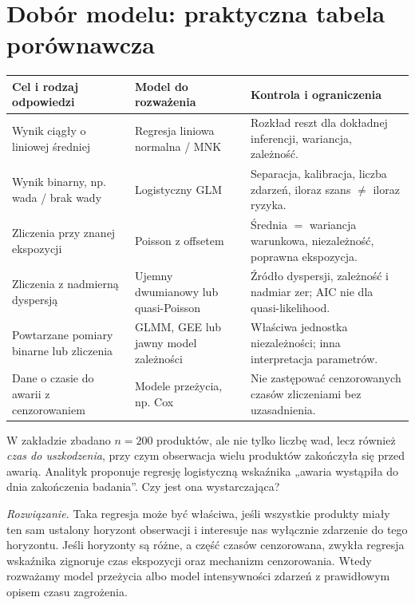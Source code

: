 \section{Dobór modelu: praktyczna tabela porównawcza}
\begin{center}\small
\begin{tabular}{>{\raggedright\arraybackslash}p{}>{\raggedright\arraybackslash}p{}>{\raggedright\arraybackslash}p{}}
\toprule
\textbf{Cel i rodzaj odpowiedzi} & \textbf{Model do rozważenia} & \textbf{Kontrola i ograniczenia}\\
\midrule
Wynik ciągły o liniowej średniej & Regresja liniowa normalna / MNK & Rozkład reszt dla dokładnej inferencji, wariancja, zależność.\\
Wynik binarny, np. wada / brak wady & Logistyczny GLM & Separacja, kalibracja, liczba zdarzeń, iloraz szans $\ne$ iloraz ryzyka.\\
Zliczenia przy znanej ekspozycji & Poisson z offsetem & Średnia $=$ wariancja warunkowa, niezależność, poprawna ekspozycja.\\
Zliczenia z nadmierną dyspersją & Ujemny dwumianowy lub quasi-Poisson & Źródło dyspersji, zależność i nadmiar zer; AIC nie dla quasi-likelihood.\\
Powtarzane pomiary binarne lub zliczenia & GLMM, GEE lub jawny model zależności & Właściwa jednostka niezależności; inna interpretacja parametrów.\\
Dane o czasie do awarii z cenzorowaniem & Modele przeżycia, np. Cox & Nie zastępować cenzorowanych czasów zliczeniami bez uzasadnienia.\\
\bottomrule
\end{tabular}
\end{center}

\begin{zadanie}
W zakładzie zbadano $n=200$ produktów, ale nie tylko
liczbę wad, lecz również \emph{czas do uszkodzenia},
przy czym obserwacja wielu produktów zakończyła się
przed awarią. Analityk proponuje regresję logistyczną
wskaźnika „awaria wystąpiła do dnia zakończenia badania”.
Czy jest ona wystarczająca?
\par\emph{Rozwiązanie.} Taka regresja może być właściwa,
jeśli wszystkie produkty miały ten sam ustalony horyzont
obserwacji i interesuje nas wyłącznie zdarzenie do
tego horyzontu. Jeśli horyzonty są różne, a część
czasów cenzorowana, zwykła regresja wskaźnika zignoruje
czas ekspozycji oraz mechanizm cenzorowania. Wtedy
rozważamy model przeżycia albo model intensywności
zdarzeń z prawidłowym opisem czasu zagrożenia.
\end{zadanie}


